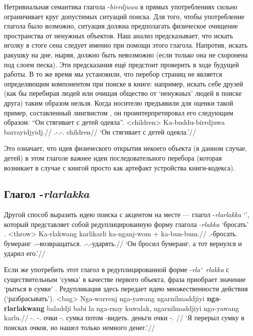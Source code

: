 Нетривиальная семантика глагола -\textit{birrdjuwa} в прямых употреблениях сильно ограничивает круг допустимых ситуаций поиска. Для того, чтобы употребление глагола было возможно, ситуация должна предполагать физическое очищение пространства от ненужных объектов. %
Наш анализ предсказывает, что искать иголку в стоге сена следует именно при помощи этого глагола. Напротив, искать ракушку на дне, ныряя, должно быть невозможно (если только она не схоронена под слоем песка). Эти предсказания ещё предстоит проверить в ходе будущей работы. В то же время мы установили, что перебор страниц не является определяющим компонентом при поиске в книге: например, искать себе друзей (как бы перебирая людей или очищая общество от `ненужных' людей в поиске друга) таким образом нельзя. Когда носителю предъявили для оценки такой пример, составленный лингвистом , %
он проинтерпретировал его следующим образом: ``Он стягивает с детей одеяла''.
\ex<children>\begingl
\gla Ka-buddu-birrdjuwa barrayidjyidj.//
\glb \Tsg.\Real-\Tpl.\Obj-\bdj.\Np{} children//
\glft `Он стягивает с детей одеяла.'//%
\endgl\xe

Это означает, что идея физического открытия некоего объекта (в данном случае, детей)  в этом глаголе важнее идеи последовательного перебора (которая возникает в случае с книгой просто как артефакт устройства книги-кодекса).
\subsection{Глагол -\textit{rlarlakka}}
\label{sec:rlakka}
Другой способ выразить идею поиска с акцентом на месте --- глагол -\textit{rlarlakka} `\rlk', который представляет собой редуплицированную форму глагола -\textit{rlakka} `бросать' .
\ex<throw>\begingl
\gla Ka-rlakwang karlikarli ka-nganj-wom + ka-bun-bum.//
\glb \Tsg.\Real-бросать.\Pst{} бумеранг \Tsg.\Real-\Hith-возвращаться.\Pst{} \Tsg.\Real-\Tsg.\Obj-ударять.\Pst{}//
\glft `Он бросил бумеранг, а тот вернулся и ударил его.'//%
\endgl\xe

Если же употребить этот глагол в редуплицированной форме -\textit{rla\char`~rlakka} с существительным `сумка' в качестве первого объекта, фраза приобрает значение `рыться в сумке' . Редупликация здесь передает идею множественности действия (`разбрасывать').
\ex<bag>\begingl
\gla Nga-warrenj nga-yawang ngarnilmaddjiyi \textbf{nga}-\textbf{rlarlakwang} baladdji babi la nga-rnay kuwalak, ngarnilmaddjiyi nga-yawang karlu.//
\glb \nga-\warre.\Pst{} \nga-\yaw.\Pst{} очки \nga-\rlk.\Pst{} сумка потом \la{} \nga-видеть.\Pst{} деньги очки \nga-\yaw.\Pst{} \karlu{}//
\glft `Я перерыл сумку в поисках очков, но нашел только немного денег.'//%
\endgl\xe

